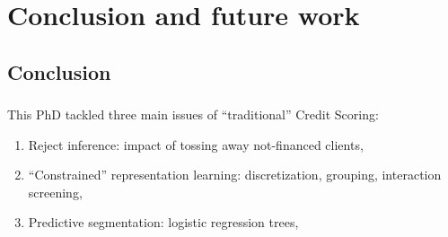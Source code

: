 \documentclass[english,xcolor={rgb,dvipsnames,table,usenames}]{beamer}
\begin{document}
%
%
%
%
%
%
%
%
%
%
%
%
%
%
%
%

\section{Conclusion and future work}

\subsection{Conclusion}

\begin{frame}
\frametitle{\subsecname}

This PhD tackled three main issues of ``traditional'' Credit Scoring:
\begin{enumerate}
\item Reject inference: impact of tossing away not-financed clients,

\medskip

\item<3-> ``Constrained'' representation learning: discretization, grouping, interaction screening,

\medskip

\item<5-> Predictive segmentation: logistic regression trees,

\medskip

\end{enumerate}

\end{frame}
\end{document}
